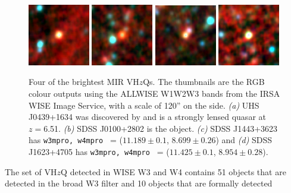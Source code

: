 \documentclass[usenatbib]{mnras}
\begin{document}
\begin{figure}
    \centering
    \includegraphics[width=0.24\textwidth]{../data/WISE/image_thumbnails/UHS_J0439+1634.png} 
    \includegraphics[width=0.24\textwidth]{../data/WISE/image_thumbnails/SDSS_J1443+3623.png}
    \includegraphics[width=0.24\textwidth]{../data/WISE/image_thumbnails/SDSS_J1623+4705.png}
    \includegraphics[width=0.24\textwidth]{../data/WISE/image_thumbnails/SDSS_J0100+2802.png}
    \caption{Four of the brightest MIR VH$z$Qs. 
      The thumbnails are the RGB colour outputs using the ALLWISE W1W2W3 bands from the 
      IRSA WISE Image Service, with a scale of 120'' on the side. 
      {\it (a)} UHS J0439+1634 was discovered by
      \citet{Fan2019} and is a strongly lensed quasar at $z=$6.51. 
      {\it (b)} SDSS J0100+2802 is the \citet{Wu2015} object. 
      {\it (c)} SDSS J1443+3623 has {\tt w3mpro, w4mpro } = ($11.189\pm0.1$, $8.699\pm0.26$) and 
      {\it (d)} SDSS J1623+4705 has {\tt w3mpro, w4mpro } = ($11.425\pm0.1$, $8.954\pm0.28$).}
    \label{fig:VHzQ_W4s}
\end{figure}
The set of VH$z$Q detected in WISE W3 and W4 contains 51 objects that are
detected in the broad W3 filter and 10 objects that are formally detected
\end{document}
